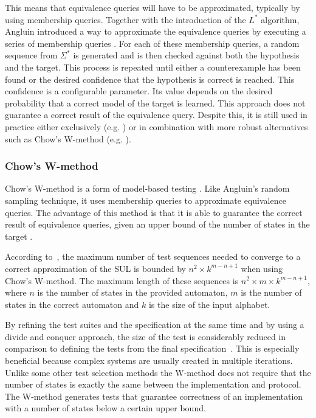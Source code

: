 This means that equivalence queries will have to be approximated, typically by
using membership queries. Together with the introduction of the $L^*$ algorithm,
Angluin introduced a way to approximate the equivalence queries by executing a
series of membership queries \cite{Angluin1987}. For each of these membership
queries, a random sequence from $\Sigma^*$ is generated and is then checked
against both the hypothesis and the target. This process is repeated until
either a counterexample has been found or the desired confidence that the
hypothesis is correct is reached. This confidence is a configurable parameter.
Its value depends on the desired probability that a correct model of the target
is learned. This approach does not guarantee a correct result of the equivalence
query. Despite this, it is still used in practice either exclusively (e.g.
\cite{Cho2010}) or in combination with more robust alternatives such as Chow's
W-method (e.g. \cite{Bauer2014}).

\subsubsection{Chow's W-method}
\label{sec:chow}

Chow's W-method is a form of model-based testing \cite{deRuiter2015, Chow1978}.
Like Angluin's random sampling technique, it uses membership queries to
approximate equivalence queries. The advantage of this method is that it is able
to guarantee the correct result of equivalence queries, given an upper bound of
the number of states in the target \cite{Ipate2007}.

According to~\cite{Vasilevskii1973}, the maximum number of test sequences needed
to converge to a correct approximation of the SUL is bounded by $n^{2} \times
k^{m-n+1}$ when using Chow's W-method. The maximum length of these sequences is
$n^{2} \times m \times k^{m-n+1}$, where $n$ is the number of states in the
provided automaton, $m$ is the number of states in the correct automaton and $k$
is the size of the input alphabet.

By refining the test suites and the specification at the same time
and by using a divide and conquer approach, the size of the test is
considerably reduced in comparison to defining the tests from
the final specification~\cite{Ipate2007, Chow1978}.
This is especially beneficial because complex systems are usually
created in multiple iterations.
Unlike some other test selection methods the W-method does not require
that the number of states is exactly the same between
the implementation and protocol.
The W-method generates tests that guarantee correctness of an
implementation with a number of states below a certain upper bound.

